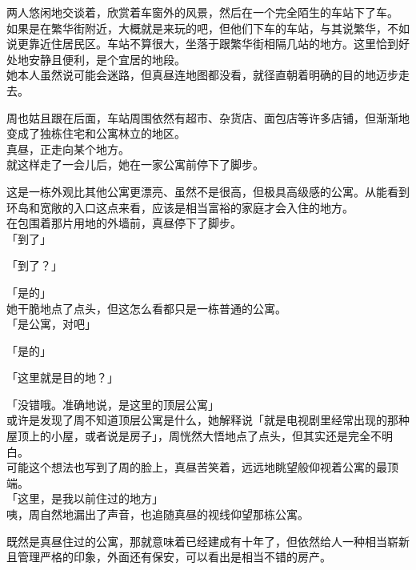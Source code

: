 两人悠闲地交谈着，欣赏着车窗外的风景，然后在一个完全陌生的车站下了车。\\

如果是在繁华街附近，大概就是来玩的吧，但他们下车的车站，与其说繁华，不如说更靠近住居民区。车站不算很大，坐落于跟繁华街相隔几站的地方。这里恰到好处地安静且便利，是个宜居的地段。\\

她本人虽然说可能会迷路，但真昼连地图都没看，就径直朝着明确的目的地迈步走去。

周也姑且跟在后面，车站周围依然有超市、杂货店、面包店等许多店铺，但渐渐地变成了独栋住宅和公寓林立的地区。\\

真昼，正走向某个地方。\\

就这样走了一会儿后，她在一家公寓前停下了脚步。

这是一栋外观比其他公寓更漂亮、虽然不是很高，但极具高级感的公寓。从能看到环岛和宽敞的入口这点来看，应该是相当富裕的家庭才会入住的地方。\\

在包围着那片用地的外墙前，真昼停下了脚步。\\

「到了」

「到了？」

「是的」\\

她干脆地点了点头，但这怎么看都只是一栋普通的公寓。\\

「是公寓，对吧」

「是的」

「这里就是目的地？」

「没错哦。准确地说，是这里的顶层公寓」\\

或许是发现了周不知道顶层公寓是什么，她解释说「就是电视剧里经常出现的那种屋顶上的小屋，或者说是房子」，周恍然大悟地点了点头，但其实还是完全不明白。\\

可能这个想法也写到了周的脸上，真昼苦笑着，远远地眺望般仰视着公寓的最顶端。\\

「这里，是我以前住过的地方」\\

咦，周自然地漏出了声音，也追随真昼的视线仰望那栋公寓。

既然是真昼住过的公寓，那就意味着已经建成有十年了，但依然给人一种相当崭新且管理严格的印象，外面还有保安，可以看出是相当不错的房产。\\

